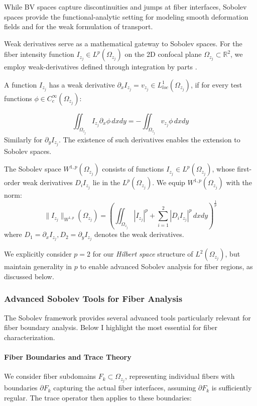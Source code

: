 \documentclass[11pt]{article}
\begin{document}
While BV spaces capture discontinuities and jumps at fiber interfaces, Sobolev spaces provide the functional-analytic setting for modeling smooth deformation fields and for the weak formulation of transport. 

 Weak derivatives serve as a mathematical gateway to Sobolev spaces. For the fiber intensity function $I_{z_j}\in L^p(\Omega_{z_j})$ on the 2D confocal plane $\Omega_{z_j} \subset \mathbb{R}^2$, we employ weak-derivatives defined through integration by parts \cite{evans2022partial}. 

A function $I_{z_j}$ has a weak derivative $\partial_xI_{z_j} = v_{z_j} \in L_{loc}^1(\Omega_{z_j})$, if for every test functions $\phi \in C_c^\infty(\Omega_{z_j})$:

\[
\iint_{\Omega_{z_j}} I_{z_j} \partial_x \phi \, dxdy = -\iint_{\Omega_{z_j}} v_{z_j} \phi \, dxdy
\]
 Similarly for $\partial_y I_{z_j}$. The existence of such derivatives enables the extension to Sobolev spaces.

The Sobolev space $W^{1, p}(\Omega_{z_j})$ consists of functions $I_{z_j} \in L^p(\Omega_{z_j})$, whose first-order weak derivatives $D_iI_{z_j}$ lie in the $L^p(\Omega_{z_j})$. We equip $W^{1, p}(\Omega_{z_j})$ with the norm:
\[
\|I_{z_j}\|_{W^{1, p}}(\Omega_{z_j}) = \left(\iint_{\Omega_{z_j}}|I_{z_j}|^p + \sum_{i=1}^2|D_iI_{z_j}|^p \, dxdy \right)^{\frac{1}{p}}
\]
where $D_1 = \partial_x I_{z_j} ,  D_2 = \partial_y I_{z_j}$ denotes the weak derivatives. 

We explicitly consider $p=2$ for our \textit{Hilbert space} structure of $L^2(\Omega_{z_j})$, but maintain generality in $p$ to enable advanced Sobolev analysis for fiber regions, as discussed below. 

\subsubsection{Advanced Sobolev Tools for Fiber Analysis}

The Sobolev framework provides several advanced tools particularly relevant for fiber boundary analysis. Below I highlight the most essential for fiber characterization.

\paragraph{Fiber Boundaries and Trace Theory}

We consider fiber subdomains $F_k \subset \Omega_{z_j}$, representing individual fibers with boundaries $\partial F_k$ capturing the actual fiber interfaces, assuming $\partial F_k$ is sufficiently regular. The trace operator then applies to these boundaries:
\end{document}
